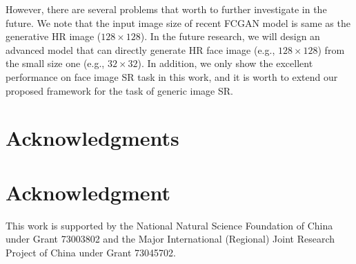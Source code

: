 \documentclass[conference,compsoc]{IEEEtran}
\begin{document}
However, there are several problems that worth to further investigate in the future. We note that the input image size of recent FCGAN model is same as the generative HR image ($128\times128$). In the future research, we will design an advanced model that can directly generate HR face image (e.g., $128\times128$) from the small size one (e.g., $32\times32$). In addition, we only show the excellent performance on face image SR task in this work, and it is worth to extend our proposed framework for the task of generic image SR.



\ifCLASSOPTIONcompsoc
  \section*{Acknowledgments}
\else
  \section*{Acknowledgment}
\fi

This work is supported by the National Natural Science Foundation of China under Grant 73003802 and the Major International (Regional) Joint Research Project of China under Grant 73045702.






\end{document}
